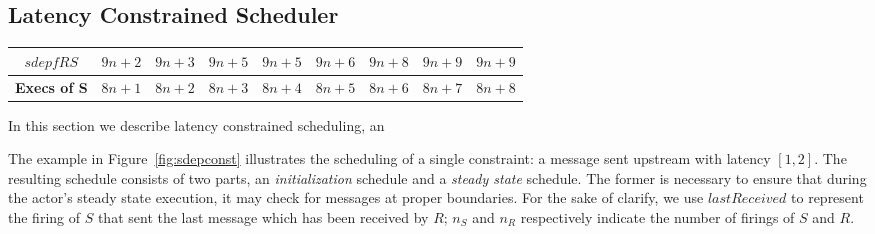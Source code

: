 \subsection{Latency Constrained Scheduler}

\begin{figure*}[t]
\begin{center}
\caption{{\small   Example   of    construction   of   a   constrained
schedule. The $\sdepf{R}{S}$ function for filters $R$ and $S$ is given
in  Table \ref{tab:sdepconst}. The  blob between  filters $R$  and $S$
illustrates other possible stream elements. $R$ sends a message to $S$
with  latency $[1,2]$.  Executions  of  the blob  are  omitted, it  is
assumed  that at the  point $S$  executes, the  blob has  drained data
provided by $R$.}}
\end{center}
\vspace{-12pt}
\label{fig:sdepconst}
\end{figure*}


\begin{table*}[t]
{\small
\begin{tabular}{|c|c|c|c|c|c|c|c|c|} \hline
{\bf $sdepf{R}{S}$} & $9n+2$ & $9n+3$  & $9n+5$  & $9n+5$ & $9n+6$ &
$9n+8$ & $9n+9$ & $9n+9$ \\ \hline
{\bf Execs of S} & $8n+1$ & $8n+2$ & $8n+3$ & $8n+4$ & $8n+5$ & $8n+6$ &
$8n+7$ & $8n+8$ \\ \hline
\end{tabular}}
\caption{\small $sdepf{R}{S}$ function for example in Figure \ref{fig:sdepconst}. This particular $\sdep$ function was obtained by setting $push_R=2$, $pop_S=3$ and making the blob between $R$ and $S$ into a filter that pops 3 and pushes 4 every iteration of its work function. No initialization due to peeking is necessary in this example.}
\label{tab:sdepconst}
\end{table*}

In this section we describe latency constrained scheduling, an 

The example  in Figure~\ref{fig:sdepconst} illustrates  the scheduling
of a single constraint: a  message sent upstream with latency $[1,2]$.
The resulting schedule consists  of two parts, an {\it initialization}
schedule and a  {\it steady state} schedule.  The  former is necessary
to ensure that during the actor's steady state execution, it may check
for messages  at proper boundaries.  For  the sake of  clarify, we use
$lastReceived$  to represent  the firing  of  $S$ that  sent the  last
message which has been  received by $R$; $n_S$ and  $n_R$ respectively indicate
the number of firings of $S$ and $R$.

